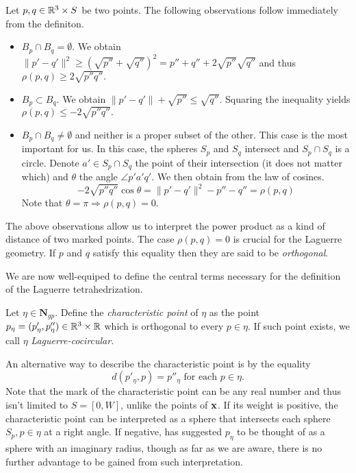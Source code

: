 \begin{remark}
Let $p,q \in {\mathbb R^3}\times S$ be two points. The following observations follow immediately from the definiton. 
\begin{itemize}
	\item $B_p\cap B_q = \emptyset$. We obtain $\|p'-q'\|^2 \geq (\sqrt{p''} + \sqrt{q''})^2 = p'' + q'' + 2\sqrt{p''}\sqrt{q''}$ and thus $\rho(p,q) \geq 2\sqrt{p'' q''}.$ 
	\item $B_p \subset B_q$. We obtain $\|p'-q'\| + \sqrt{p''} \leq \sqrt{q''} $. Squaring the inequality yields $\rho(p,q) \leq -2\sqrt{p'' q''}.$ 
	\item $B_p \cap B_q \neq \emptyset$ and neither is a proper subset of the other. This case is the most important for us. In this case, the spheres $S_p$ and $S_q$ intersect and $S_p\cap S_q$ is a circle. Denote $a' \in S_p \cap S_q$ the point of their intersection (it does not matter which) and $\theta$ the angle $\angle p'a'q'$. We then obtain from the law of cosines. 
	$$- 2\sqrt{p'' q''}\cos \theta = \|p'-q'\|^2 - p'' - q'' = \rho(p,q)$$
	Note that $\theta = \pi \Rightarrow \rho(p,q)=0$.
\end{itemize}
\end{remark}

The above observations allow us to interpret the power product as a kind of distance of two marked points. The case $\rho(p,q)=0$ is crucial for the Laguerre geometry. If $p$ and $q$ satisfy this equality then they are said to be \textit{orthogonal}. 

We are now well-equiped to define the central terms necessary for the definition of the Laguerre tetrahedrization.

\begin{definition}
	Let $\eta\in \mathbf N_{gp}$. Define the \textit{characteristic point} of $\eta$ as the point $p_{\eta} = (p'_\eta, p''_\eta) \in {\mathbb R^3} \times \mathbb R$ which is orthogonal to every $p\in \eta$. If such point exists, we call $\eta$ \textit{Laguerre-cocircular}. 
\end{definition}
An alternative way to describe the characteristic point is by the equality 
\begin{equation}\label{eq:charpoint}
	d(p'_\eta,p)=p''_\eta \text{ for each } p \in \eta.
\end{equation}
Note that the mark of the characteristic point can be any real number and thus isn't limited to $S=[0,W]$, unlike the points of ${\mathbf{x}}$.
If its weight is positive, the characteristic point can be interpreted as a sphere that intersects each sphere $S_p, p\in\eta$ at a right angle. If negative, \cite{Edelsbrunner1996} has suggested $p_\eta$ to be thought of as a sphere with an imaginary radius, though as far as we are aware, there is no further advantage to be gained from such interpretation. \newline

